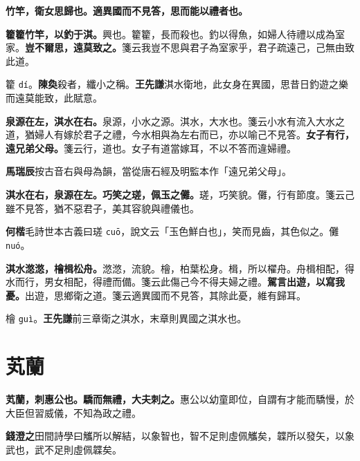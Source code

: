 
\textbf{竹竿，衛女思歸也。適異國而不見答，思而能以禮者也。}

\textbf{籊籊竹竿，以釣于淇。}{\footnotesize 興也。籊籊，長而殺也。釣以得魚，如婦人待禮以成為室家。}\textbf{豈不爾思，遠莫致之。}{\footnotesize 箋云我豈不思與君子為室家乎，君子疏遠己，己無由致此道。}

\begin{quoting}籊 \texttt{dí}。\textbf{陳奐}殺者，纖小之稱。\textbf{王先謙}淇水衛地，此女身在異國，思昔日釣遊之樂而遠莫能致，此賦意。\end{quoting}

\textbf{泉源在左，淇水在右。}{\footnotesize 泉源，小水之源。淇水，大水也。箋云小水有流入大水之道，猶婦人有嫁於君子之禮，今水相與為左右而已，亦以喻己不見答。}\textbf{女子有行，遠兄弟父母。}{\footnotesize 箋云行，道也。女子有道當嫁耳，不以不答而違婦禮。}

\begin{quoting}\textbf{馬瑞辰}按古音右與母為韻，當從唐石經及明監本作「遠兄弟父母」。\end{quoting}

\textbf{淇水在右，泉源在左。巧笑之瑳，佩玉之儺。}{\footnotesize 瑳，巧笑貌。儺，行有節度。箋云己雖不見答，猶不惡君子，美其容貌與禮儀也。}

\begin{quoting}\textbf{何楷}毛詩世本古義曰瑳 \texttt{cuō}，說文云「玉色鮮白也」，笑而見齒，其色似之。儺 \texttt{nuó}。\end{quoting}

\textbf{淇水滺滺，檜楫松舟。}{\footnotesize 滺滺，流貌。檜，柏葉松身。楫，所以櫂舟。舟楫相配，得水而行，男女相配，得禮而備。箋云此傷己今不得夫婦之禮。}\textbf{駕言出遊，以寫我憂。}{\footnotesize 出遊，思鄉衛之道。箋云適異國而不見答，其除此憂，維有歸耳。}

\begin{quoting}檜 \texttt{guì}。\textbf{王先謙}前三章衛之淇水，末章則異國之淇水也。\end{quoting}

\section{芄蘭}


\textbf{芄蘭，刺惠公也。驕而無禮，大夫刺之。}{\footnotesize 惠公以幼童即位，自謂有才能而驕慢，於大臣但習威儀，不知為政之禮。}

\begin{quoting}\textbf{錢澄之}田間詩學曰觿所以解結，以象智也，智不足則虛佩觿矣，韘所以發矢，以象武也，武不足則虛佩韘矣。\end{quoting}

